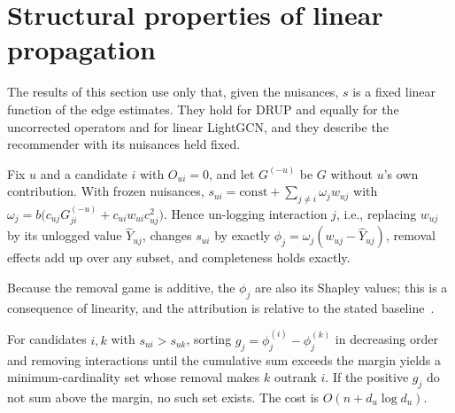 \section{Structural properties of linear propagation}\label{sec:structth}

The results of this section use only that, given the nuisances, $s$ is a
fixed linear function of the edge estimates. They hold for DRUP and equally for
the uncorrected operators and for linear LightGCN, and they describe the
recommender with its nuisances held fixed.

\begin{proposition}\label{prop:affine}
Fix $u$ and a candidate $i$ with $O_{ui}=0$, and let $G^{(-u)}$ be $G$ without
$u$'s own contribution. With frozen nuisances,
$s_{ui}=\mathrm{const}+\sum_{j\neq i}\omega_jw_{uj}$ with
$\omega_j=b\big(c_{uj}G^{(-u)}_{ji}+c_{ui}w_{ui}c_{uj}^2\big)$.
Hence un-logging interaction $j$, i.e., replacing $w_{uj}$ by its unlogged
value $\hat Y_{uj}$, changes $s_{ui}$ by exactly $\phi_j=\omega_j(w_{uj}-\hat Y_{uj})$,
removal effects add up over any subset, and completeness holds exactly.
\end{proposition}
Because the removal game is additive, the $\phi_j$ are also its Shapley values;
this is a consequence of linearity, and the attribution is relative to the
stated baseline~\cite{kumar2020shapley}.

\begin{theorem}\label{thm:cf}
For candidates $i,k$ with $s_{ui}>s_{uk}$, sorting $g_j=\phi^{(i)}_j-\phi^{(k)}_j$ in
decreasing order and removing interactions until the cumulative sum exceeds the
margin yields a minimum-cardinality set whose removal makes $k$ outrank $i$.
If the positive $g_j$ do not sum above the margin, no such set exists. The
cost is $O(n+d_u\log d_u)$.
\end{theorem}

